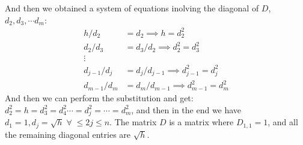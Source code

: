 \documentclass[]{article}
\begin{document}
        And then we obtained a system of equations inolving the diagonal of $D$, $d_2, d_3, \cdots d_m$: 
        \begin{align*}\tag{6.a.2}\label{eqn:6.a.2}
            h/d_2 &= d_2 
            \implies h = d_2^2
            \\
            d_2/d_3 &= d_3/d_2
            \implies d_2^2 = d_3^2
            \\
            \vdots
            \\
            d_{j - 1}/d_j &= d_j/d_{j -1}
            \implies
            d_{j - 1}^2 = d_{j}^2
            \\
            d_{m - 1}/d_m &= d_m/d_{m - 1}
            \implies 
            d_{m - 1}^2 = d_m^2
        \end{align*}
        And then we can perform the substitution and get: 
        $d_2^2 = h = d_3^2 = d_4^2 \cdots = d_j^2 =\cdots =d_m^2$, and then in the end we have $d_1 = 1, d_j = \sqrt{h}\;\forall \; \le 2 j \le n$. The matrix $D$ is a matrix where $D_{1, 1} = 1$, and all the remaining diagonal entries are $\sqrt{h}$.
\end{document}

